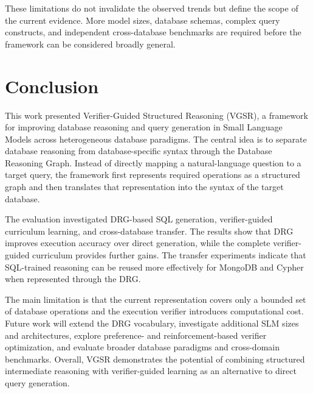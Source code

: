 \documentclass[conference]{IEEEtran}
\begin{document}
These limitations do not invalidate the observed trends but define the scope of the current evidence. More model sizes, database schemas, complex query constructs, and independent cross-database benchmarks are required before the framework can be considered broadly general.

\section{Conclusion}
\label{sec:conclusion}
This work presented Verifier-Guided Structured Reasoning (VGSR), a framework for improving database reasoning and query generation in Small Language Models across heterogeneous database paradigms. The central idea is to separate database reasoning from database-specific syntax through the Database Reasoning Graph. Instead of directly mapping a natural-language question to a target query, the framework first represents required operations as a structured graph and then translates that representation into the syntax of the target database.

The evaluation investigated DRG-based SQL generation, verifier-guided curriculum learning, and cross-database transfer. The results show that DRG improves execution accuracy over direct generation, while the complete verifier-guided curriculum provides further gains. The transfer experiments indicate that SQL-trained reasoning can be reused more effectively for MongoDB and Cypher when represented through the DRG.

The main limitation is that the current representation covers only a bounded set of database operations and the execution verifier introduces computational cost. Future work will extend the DRG vocabulary, investigate additional SLM sizes and architectures, explore preference- and reinforcement-based verifier optimization, and evaluate broader database paradigms and cross-domain benchmarks. Overall, VGSR demonstrates the potential of combining structured intermediate reasoning with verifier-guided learning as an alternative to direct query generation.
\end{document}
